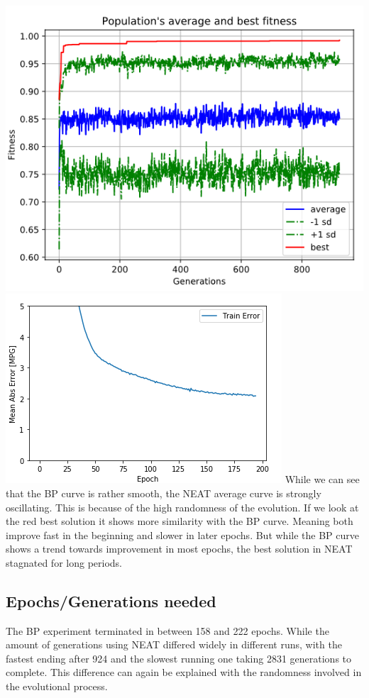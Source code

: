 \documentclass{llncs}
\begin{document}
\includegraphics[scale=0.36]{Fitness.png}
\includegraphics[scale=0.5328]{BP.png}
\newline
\newline
%
While we can see that the BP curve is rather smooth, the NEAT average curve is strongly oscillating. This is because of the high randomness of the evolution. If we look at the red best solution it shows more similarity with the BP curve. Meaning both improve fast in the beginning and slower in later epochs. But while the BP curve shows a trend towards improvement in most epochs, the best solution in NEAT stagnated for long periods.   
%
\subsection{Epochs/Generations needed}
%
The BP experiment terminated in between 158 and 222 epochs. While the amount of generations using NEAT differed widely in different runs, with the fastest ending after 924 and the slowest running one taking 2831 generations to complete. This difference can again be explained with the randomness involved in the evolutional process.
%
\end{document}
